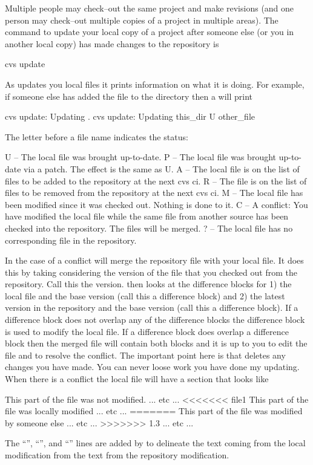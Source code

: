 Multiple people may check--out the same project and make revisions
(and one person may check--out multiple copies of a project in
multiple areas). The command to update your local copy of a project
after someone else (or you in another local copy) has made changes to
the repository is
\begin{example}
  cvs update
\end{example}
As \cvs updates you local files it prints information on what it is
doing. For example, if someone else has added the file 
to the  directory then a  will print
\begin{example}
  cvs update: Updating .
  cvs update: Updating this_dir
  U other_file
\end{example}
The letter before a file name indicates the status:
\begin{example}
  U -- The local file was brought up-to-date.
  P -- The local file was brought up-to-date via a patch. The effect is the same as U.
  A -- The local file is on the list of files to be added to the repository
          at the next cvs ci.
  R -- The file is on the list of files to be removed from the repository
          at the next cvs ci.
  M -- The local file has been modified since it was checked out. 
          Nothing is done to it.
  C -- A conflict: You have modified the local file while the same file
          from another source has been checked into the repository.
          The files will be merged.
  ? -- The local file has no corresponding file in the repository.
\end{example}
In the case of a conflict \cvs will merge the repository file with
your local file. It does this by taking considering the version of the
file that you checked out from the repository. Call this the 
version. \cvs then looks at the difference blocks for 1) the local
file and the base version (call this a  difference block)
and 2) the latest version in the repository and the base version (call
this a  difference block). If a 
difference block does not overlap any of the  difference
blocks the difference block is used to modify the local file. If a
 difference block does overlap a  difference
block then the merged file will contain both blocks and it is up to
you to edit the file and to resolve the conflict. The important point
here is that  deletes any changes you have made. You
can never loose work you have done my updating. When there is a
conflict the local file will have a section that looks like
\begin{example}
  This part of the file was not modified.
  ... etc ...
  <<<<<<< file1
  This part of the file was locally modified
  ... etc ...
  =======
  This part of the file was modified by someone else
  ... etc ...
  >>>>>>> 1.3
  ... etc ...
\end{example}
The ``'', ``\vn{=======}'', and ``''
lines are added by \cvs to delineate the text coming from the local
modification from the text from the repository modification.

